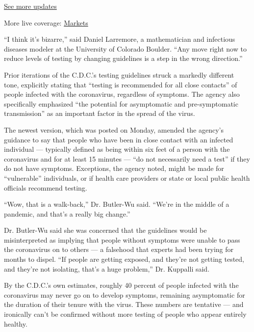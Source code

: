 \href{https://www.nytimes3xbfgragh.onion/2020/09/11/world/covid-19-coronavirus.html?action=click\&pgtype=Article\&state=default\&region=MAIN_CONTENT_1\&context=storylines_live_updates}{See
more updates}

More live coverage:
\href{https://www.nytimes3xbfgragh.onion/live/2020/09/11/business/stock-market-today-coronavirus?action=click\&pgtype=Article\&state=default\&region=MAIN_CONTENT_1\&context=storylines_live_updates}{Markets}

``I think it's bizarre,'' said Daniel Larremore, a mathematician and
infectious diseases modeler at the University of Colorado Boulder. ``Any
move right now to reduce levels of testing by changing guidelines is a
step in the wrong direction.''

Prior iterations of the C.D.C.'s testing guidelines struck a markedly
different tone, explicitly stating that ``testing is recommended for all
close contacts'' of people infected with the coronavirus, regardless of
symptoms. The agency also specifically emphasized ``the potential for
asymptomatic and pre-symptomatic transmission'' as an important factor
in the spread of the virus.

The newest version, which was posted on Monday, amended the agency's
guidance to say that people who have been in close contact with an
infected individual --- typically defined as being within six feet of a
person with the coronavirus and for at least 15 minutes --- ``do not
necessarily need a test'' if they do not have symptoms. Exceptions, the
agency noted, might be made for ``vulnerable'' individuals, or if health
care providers or state or local public health officials recommend
testing.

``Wow, that is a walk-back,'' Dr. Butler-Wu said. ``We're in the middle
of a pandemic, and that's a really big change.''

Dr. Butler-Wu said she was concerned that the guidelines would be
misinterpreted as implying that people without symptoms were unable to
pass the coronavirus on to others --- a falsehood that experts had been
trying for months to dispel. ``If people are getting exposed, and
they're not getting tested, and they're not isolating, that's a huge
problem,'' Dr. Kuppalli said.

By the C.D.C.'s own estimates, roughly 40 percent of people infected
with the coronavirus may never go on to develop symptoms, remaining
asymptomatic for the duration of their tenure with the virus. These
numbers are tentative --- and ironically can't be confirmed without more
testing of people who appear entirely healthy.

